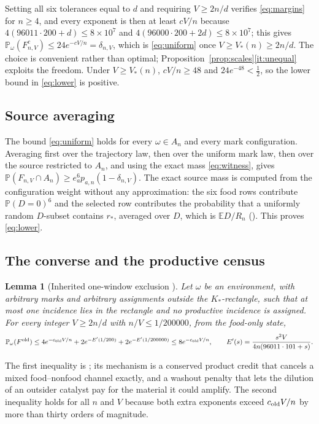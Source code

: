 \documentclass[11pt,letterpaper]{article}
\theoremstyle{plain}
\newtheorem{lemma}[theorem]{Lemma}
\theoremstyle{definition}
\theoremstyle{remark}
\numberwithin{equation}{section}
\newcommand{\PP}{\mathbb P}
\newcommand{\EE}{\mathbb E}
\newcommand{\Fold}{F^{\mathrm{old}}}
\begin{document}
Setting all six tolerances equal to $d$ and requiring $V\ge2n/d$ verifies \eqref{eq:margins} for $n\ge4$, and every exponent is then at least $cV/n$ because $4(96011\cdot200+d)\le8\times10^7$ and $4(96000\cdot200+2d)\le8\times10^7$; this gives $\PP_\omega(F_{n,V}^c)\le24e^{-cV/n}=\delta_{n,V}$, which is \eqref{eq:uniform} once $V\ge V_*(n)\ge2n/d$. The choice is convenient rather than optimal; Proposition~\ref{prop:scales}\ref{it:unequal} exploits the freedom. Under $V\ge V_*(n)$, $cV/n\ge48$ and $24e^{-48}<\tfrac12$, so the lower bound in \eqref{eq:lower} is positive.

\subsection{Source averaging}\label{sec:averaging}
The bound \eqref{eq:uniform} holds for every $\omega\in A_n$ and every mark configuration. Averaging first over the trajectory law, then over the uniform mark law, then over the source restricted to $A_n$, and using the exact mass \eqref{eq:witness}, gives $\PP(F_{n,V}\cap A_n)\ge e_a^6p_{a,n}(1-\delta_{n,V})$. The exact source mass is computed from the configuration weight without any approximation: the six food rows contribute $\PP(D=0)^6$ and the selected row contributes the probability that a uniformly random $D$-subset contains $r_*$, averaged over $D$, which is $\EE D/R_n$ (). This proves \eqref{eq:lower}.

\subsection{The converse and the productive census}\label{sec:converse}
\begin{lemma}[Inherited one-window exclusion \cite{diffuse2026}]\label{lem:exclusion}
Let $\omega$ be an environment, with arbitrary marks and arbitrary assignments outside the $K_*$-rectangle, such that at most one incidence lies in the rectangle and no productive incidence is assigned. For every integer $V\ge2n/d$ with $n/V\le1/200000$, from the food-only state,
\begin{equation}\label{eq:exclusion}
 \PP_\omega(\Fold)\le4e^{-c_{\rm old}V/n}+2e^{-E'(1/200)}+2e^{-E'(1/200000)}\le8e^{-c_{\rm old}V/n},
 \qquad E'(s)=\frac{s^2V}{4n(96011\cdot101+s)} .
\end{equation}
\end{lemma}
The first inequality is ; its mechanism is a conserved product credit that cancels a mixed food--nonfood channel exactly, and a washout penalty that lets the dilution of an outsider catalyst pay for the material it could amplify. The second inequality holds for all $n$ and $V$ because both extra exponents exceed $c_{\rm old}V/n$ by more than thirty orders of magnitude.
\end{document}
